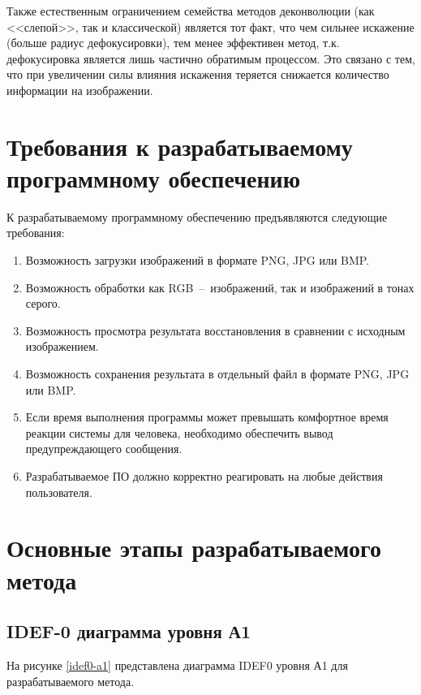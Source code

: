 Также естественным ограничением семейства методов деконволюции (как <<слепой>>, так и классической) является тот факт, что чем сильнее искажение (больше радиус дефокусировки), тем менее эффективен метод, т.к. дефокусировка является лишь частично обратимым процессом. Это связано с тем, что при увеличении силы влияния искажения теряется снижается количество информации на изображении.

\section{Требования к разрабатываемому программному обеспечению}

К разрабатываемому программному обеспечению предъявляются следующие требования:

\begin{enumerate}
	\item Возможность загрузки изображений в формате PNG, JPG или BMP.
	\item Возможность обработки как RGB~--~изображений, так и изображений в тонах серого.
	\item Возможность просмотра результата восстановления в сравнении с исходным изображением.
	\item Возможность сохранения результата в отдельный файл в формате PNG, JPG или BMP.
	\item Если время выполнения программы может превышать комфортное время реакции системы для человека, необходимо обеспечить вывод предупреждающего сообщения. 
	\item Разрабатываемое ПО должно корректно реагировать на любые действия пользователя.
\end{enumerate}

\clearpage

\section{Основные этапы разрабатываемого метода}

\subsection{IDEF-0 диаграмма уровня А1}

На рисунке \ref{idef0-a1} представлена диаграмма IDEF0 уровня А1 для разрабатываемого метода.

